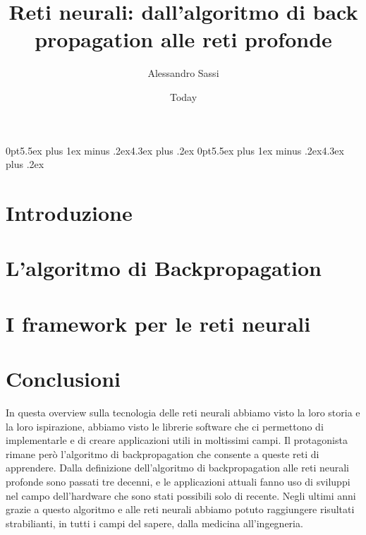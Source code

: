 \documentclass [12pt,oneside,a4paper,openany]{book}
\begin{document}
\title{Reti neurali: dall'algoritmo di back propagation alle reti profonde }
\author{Alessandro Sassi}
\date{Today}

\titlespacing*{\section}
{0pt}{5.5ex plus 1ex minus .2ex}{4.3ex plus .2ex}
\titlespacing*{\subsection}
{0pt}{5.5ex plus 1ex minus .2ex}{4.3ex plus .2ex}






\tableofcontents
\chapter{Introduzione}

\chapter{L'algoritmo di Backpropagation }

\chapter{I framework per le reti neurali}


\chapter{Conclusioni}
In questa overview sulla tecnologia delle reti neurali abbiamo visto la loro storia e la loro ispirazione, abbiamo visto le librerie software che ci permettono di implementarle e di creare applicazioni utili in moltissimi campi. Il protagonista rimane però l'algoritmo di backpropagation che consente a queste reti di apprendere. Dalla definizione dell'algoritmo di backpropagation alle reti neurali profonde sono passati tre decenni, e le applicazioni attuali fanno uso di sviluppi nel campo dell'hardware che sono stati possibili solo di recente. Negli ultimi anni grazie a questo algoritmo e alle reti neurali abbiamo potuto raggiungere risultati strabilianti, in tutti i campi del sapere, dalla medicina all'ingegneria.
\end{document}
